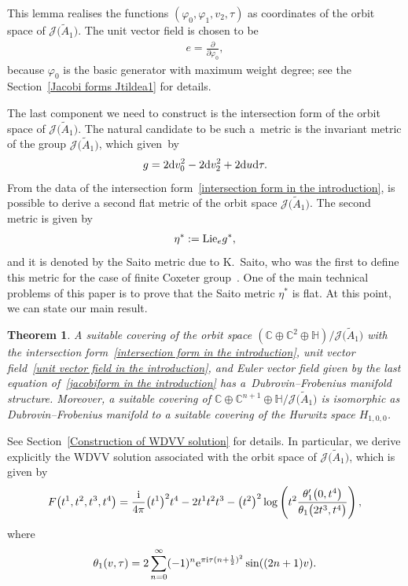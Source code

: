 \documentclass[10pt,a4paper]{amsart}
\numberwithin{equation}{section}
\newtheorem{Theorem}{Theorem}[section]
\newcommand{\Ja}{\mathcal{J}}
\begin{document}
This lemma realises the functions $(\varphi_0,\varphi_1,v_{2},\tau)$ as coordinates of the orbit space of $\Ja\big(\tilde A_1\big)$.
The unit vector field is chosen to be
\begin{gather}\label{unit vector field in the introduction}
e=\frac{\partial}{\partial \varphi_0},
\end{gather}
because $\varphi_0$ is the basic generator with maximum weight degree; see the Section~\ref{Jacobi forms Jtildea1} for details.

The last component we need to construct is the intersection form of the orbit space of $\Ja\big(\tilde A_1\big)$. The natural candidate to be such a~metric is the invariant metric of the group $\Ja\big(\tilde A_1\big)$, which given~by
\begin{gather}\label{intersection form in the introduction}
g=2{\rm d}v_0^2-2{\rm d}v_2^2+2{\rm d}u{\rm d}\tau.
\end{gather}
From the data of the intersection form~\eqref{intersection form in the introduction}, is possible to derive a second flat metric of the orbit space $\Ja\big(\tilde A_1\big)$.
 The second metric is given by
\begin{gather*}
\eta^{*}:={\rm Lie}_{e}g^{*},
\end{gather*}
and it is denoted by the Saito metric due to K.~Saito, who was the first to define this metric for the case of finite Coxeter group~\cite{Saito}. One of the main technical problems of this paper is to prove that the Saito metric $\eta^{*}$ is flat. At this point, we can state our main result.

\begin{Theorem}
A suitable covering of the orbit space $\left(\mathbb{C}\oplus\mathbb{C}^{2}\oplus\mathbb{H}\right)/\Ja\big(\tilde A_1\big)$ with the intersection form~\eqref{intersection form in the introduction}, unit vector field~\eqref{unit vector field in the introduction}, and Euler vector field given by the last equation of~\eqref{jacobiform in the introduction} has a~Dub\-rovin--Frobenius manifold structure. Moreover, a suitable covering of $\mathbb{C}\oplus\mathbb{C}^{n+1}\oplus\mathbb{H}/\Ja\big(\tilde A_1\big)$ is isomorphic as Dubrovin--Frobenius manifold to a suitable covering of the Hurwitz space $H_{1,0,0}$.
\end{Theorem}
See Section~\ref{Construction of WDVV solution} for details. In particular, we derive explicitly the WDVV solution associated with the orbit space of $\Ja\big(\tilde A_1\big)$, which is given by
\begin{gather*}
F\big(t^1,t^2,t^3,t^4\big)=\frac{\rm i}{4\pi}\big(t^1\big)^2t^4-2t^1t^2t^3
-\big(t^2\big)^2\log\left(t^2\frac{\theta_1^{\prime}\big(0,t^4\big)}{\theta_1\big(2t^3,t^4\big)}\right),
\end{gather*}
where
\begin{gather}
\label{theta def}
\theta_1(v,\tau)=2\sum_{n=0}^{\infty} (-1)^{n}{\rm e}^{\pi {\rm i}\tau(n+\frac{1}{2})^2 }\sin((2n+1)v).
\end{gather}
\end{document}
